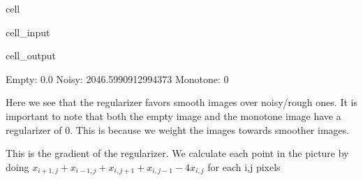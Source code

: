 \documentclass[letterpaper,10pt,english]{jupyterBook}
\begin{document}
\begin{sphinxuseclass}{cell}\begin{sphinxVerbatimInput}

\begin{sphinxuseclass}{cell_input}
\begin{sphinxVerbatim}[commandchars=\\\{\}]
\end{sphinxVerbatim}

\end{sphinxuseclass}\end{sphinxVerbatimInput}
\begin{sphinxVerbatimOutput}

\begin{sphinxuseclass}{cell_output}
\begin{sphinxVerbatim}[commandchars=\\\{\}]
Empty: \PYGZhy{}0.0
Noisy: \PYGZhy{}2046.5990912994373
Monotone: 0
\end{sphinxVerbatim}

\end{sphinxuseclass}\end{sphinxVerbatimOutput}

\end{sphinxuseclass}
\sphinxAtStartPar
Here we see that the regularizer favors smooth images over noisy/rough ones. It is important to note that both the empty image and the monotone image have a regularizer of 0. This is because we weight the images towards smoother images.

\sphinxAtStartPar
This is the gradient of the regularizer.
We calculate each point in the picture by doing \(x_{i+1,j} + x_{i-1,j} + x_{i,j+1} + x_{i,j-1} - 4x_{i,j}\) for each i,j pixels
\end{document}
